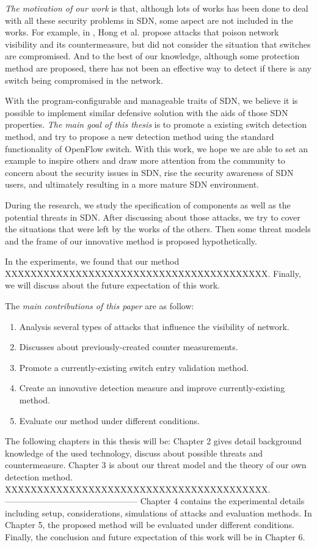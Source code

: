\emph{The motivation of our work} is that, although lots of works has been done to deal with all these security problems in SDN, some aspect are not included in the works. For example, in \cite{HXWG15}, Hong et al. propose attacks that poison network visibility and its countermeasure, but did not consider the situation that switches are compromised. And to the best of our knowledge, although some protection method are proposed, there has not been an effective way to detect if there is any switch being compromised in the network.

With the program-configurable and manageable traits of SDN, we believe it is possible to implement similar defensive solution with the aids of those SDN properties. \emph{The main goal of this thesis} is to promote a existing switch detection method, and try to propose a new detection method using the standard functionality of OpenFlow switch. With this work, we hope we are able to set an example to inspire others and draw more attention from the community to concern about the security issues in SDN, rise the security awareness of SDN users, and ultimately resulting in a more mature SDN environment.

During the research, we study the specification of components as well as the potential threats in SDN. After discussing about those attacks, we try to cover the situations that were left by the works of the others. Then some threat models and the frame of our innovative method is proposed hypothetically. 

In the experiments, we found that our method XXXXXXXXXXXXXXXXXXXXXXXXXXXXXXXXXXXXXXXXX. Finally, we will discuss about the future expectation of this work.

The \emph{main contributions of this paper} are as follow:

\begin{enumerate}
\item
Analysis several types of attacks that influence the visibility of network.
\item
Discusses about previously-created counter measurements.
\item
Promote a currently-existing switch entry validation method.
\item
Create an innovative detection measure and improve currently-existing method.
\item
Evaluate our method under different conditions.
\end{enumerate}

The following chapters in this thesis will be: Chapter 2 gives detail background knowledge of the used technology, discuss about possible threats and countermeasure. Chapter 3 is about our threat model and the theory of our own detection method. XXXXXXXXXXXXXXXXXXXXXXXXXXXXXXXXXXXXXXXXX.
-----------------------------------------------
Chapter 4 contains the experimental details including setup, considerations, simulations of attacks and evaluation methods. In Chapter 5, the proposed method will be evaluated under different conditions. Finally, the conclusion and future expectation of this work will be in Chapter 6.